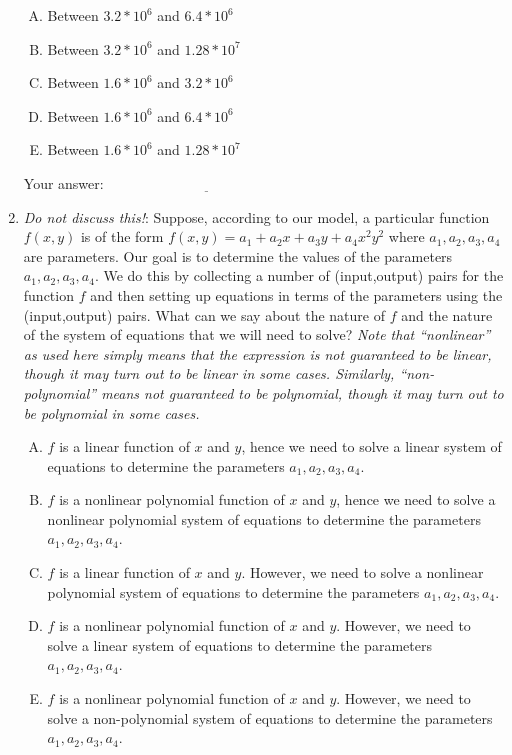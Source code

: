 \documentclass[10pt]{amsart}
\begin{document}
\begin{enumerate}
  \begin{enumerate}[(A)]
  \item Between $3.2 * 10^6$ and $6.4 * 10^6$
  \item Between $3.2 * 10^6$ and $1.28 * 10^7$
  \item Between $1.6 * 10^6$ and $3.2 * 10^6$
  \item Between $1.6 * 10^6$ and $6.4 * 10^6$
  \item Between $1.6 * 10^6$ and $1.28 * 10^7$
  \end{enumerate}

  \vspace{0.1in}
  Your answer: $\underline{\qquad\qquad\qquad\qquad\qquad\qquad\qquad}$
  \vspace{0.6in}

\item {\em Do not discuss this!}: Suppose, according to our model, a
  particular function $f(x,y)$ is of the form $f(x,y) = a_1 + a_2x +
  a_3y + a_4x^2y^2$ where $a_1,a_2,a_3,a_4$ are parameters. Our goal
  is to determine the values of the parameters $a_1,a_2,a_3,a_4$. We
  do this by collecting a number of (input,output) pairs for the
  function $f$ and then setting up equations in terms of the
  parameters using the (input,output) pairs. What can we say about the
  nature of $f$ and the nature of the system of equations that we will
  need to solve?  {\em Note that ``nonlinear'' as used here simply
    means that the expression is not guaranteed to be linear, though
    it may turn out to be linear in some cases. Similarly,
    ``non-polynomial'' means not guaranteed to be polynomial, though
    it may turn out to be polynomial in some cases.}

  \begin{enumerate}[(A)]
  \item $f$ is a linear function of $x$ and $y$, hence we need to
    solve a linear system of equations to determine the parameters
    $a_1,a_2,a_3,a_4$.
  \item $f$ is a nonlinear polynomial function of $x$ and $y$, hence
    we need to solve a nonlinear polynomial system of equations to
    determine the parameters $a_1,a_2,a_3,a_4$.
  \item $f$ is a linear function of $x$ and $y$. However, we need to
    solve a nonlinear polynomial system of equations to determine the
    parameters $a_1,a_2,a_3,a_4$.
  \item $f$ is a nonlinear polynomial function of $x$ and
    $y$. However, we need to solve a linear system of equations to
    determine the parameters $a_1,a_2,a_3,a_4$.
  \item $f$ is a nonlinear polynomial function of $x$ and
    $y$. However, we need to solve a non-polynomial system of
    equations to determine the parameters $a_1,a_2,a_3,a_4$.
  \end{enumerate}


\end{enumerate}
\end{document}
